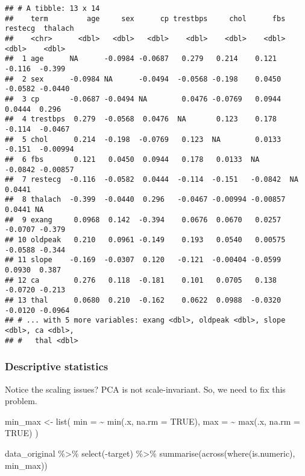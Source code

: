 \documentclass[
]{book}
\newenvironment{Shaded}{\begin{snugshade}}{\end{snugshade}}
\newcommand{\AttributeTok}[1]{\textcolor[rgb]{0.77,0.63,0.00}{#1}}
\newcommand{\ConstantTok}[1]{\textcolor[rgb]{0.00,0.00,0.00}{#1}}
\newcommand{\FunctionTok}[1]{\textcolor[rgb]{0.00,0.00,0.00}{#1}}
\newcommand{\NormalTok}[1]{#1}
\newcommand{\OtherTok}[1]{\textcolor[rgb]{0.56,0.35,0.01}{#1}}
\newcommand{\SpecialCharTok}[1]{\textcolor[rgb]{0.00,0.00,0.00}{#1}}
\begin{document}
\begin{verbatim}
## # A tibble: 13 x 14
##    term         age     sex      cp trestbps     chol      fbs restecg  thalach
##    <chr>      <dbl>   <dbl>   <dbl>    <dbl>    <dbl>    <dbl>   <dbl>    <dbl>
##  1 age      NA      -0.0984 -0.0687   0.279   0.214    0.121   -0.116  -0.399  
##  2 sex      -0.0984 NA      -0.0494  -0.0568 -0.198    0.0450  -0.0582 -0.0440 
##  3 cp       -0.0687 -0.0494 NA        0.0476 -0.0769   0.0944   0.0444  0.296  
##  4 trestbps  0.279  -0.0568  0.0476  NA       0.123    0.178   -0.114  -0.0467 
##  5 chol      0.214  -0.198  -0.0769   0.123  NA        0.0133  -0.151  -0.00994
##  6 fbs       0.121   0.0450  0.0944   0.178   0.0133  NA       -0.0842 -0.00857
##  7 restecg  -0.116  -0.0582  0.0444  -0.114  -0.151   -0.0842  NA       0.0441 
##  8 thalach  -0.399  -0.0440  0.296   -0.0467 -0.00994 -0.00857  0.0441 NA      
##  9 exang     0.0968  0.142  -0.394    0.0676  0.0670   0.0257  -0.0707 -0.379  
## 10 oldpeak   0.210   0.0961 -0.149    0.193   0.0540   0.00575 -0.0588 -0.344  
## 11 slope    -0.169  -0.0307  0.120   -0.121  -0.00404 -0.0599   0.0930  0.387  
## 12 ca        0.276   0.118  -0.181    0.101   0.0705   0.138   -0.0720 -0.213  
## 13 thal      0.0680  0.210  -0.162    0.0622  0.0988  -0.0320  -0.0120 -0.0964 
## # ... with 5 more variables: exang <dbl>, oldpeak <dbl>, slope <dbl>, ca <dbl>,
## #   thal <dbl>
\end{verbatim}

\hypertarget{descriptive-statistics}{%
\subsubsection{Descriptive statistics}\label{descriptive-statistics}}

Notice the scaling issues? PCA is not scale-invariant. So, we need to fix this problem.

\begin{Shaded}
\begin{Highlighting}[]
\NormalTok{min\_max }\OtherTok{\textless{}{-}} \FunctionTok{list}\NormalTok{(}
  \AttributeTok{min =} \SpecialCharTok{\textasciitilde{}} \FunctionTok{min}\NormalTok{(.x, }\AttributeTok{na.rm =} \ConstantTok{TRUE}\NormalTok{),}
  \AttributeTok{max =} \SpecialCharTok{\textasciitilde{}} \FunctionTok{max}\NormalTok{(.x, }\AttributeTok{na.rm =} \ConstantTok{TRUE}\NormalTok{)}
\NormalTok{)}

\NormalTok{data\_original }\SpecialCharTok{\%\textgreater{}\%}
  \FunctionTok{select}\NormalTok{(}\SpecialCharTok{{-}}\NormalTok{target) }\SpecialCharTok{\%\textgreater{}\%}
  \FunctionTok{summarise}\NormalTok{(}\FunctionTok{across}\NormalTok{(}\FunctionTok{where}\NormalTok{(is.numeric), min\_max))}
\end{Highlighting}
\end{Shaded}
\end{document}
